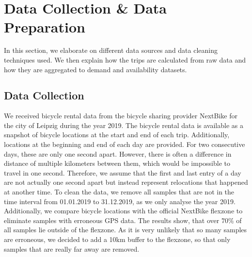 \section{Data Collection \& Data Preparation}
\label{sec:data_collection_and_data_preparation}
In this section, we elaborate on different data sources and data cleaning techniques used. We then explain how the trips are calculated from raw data and how they are aggregated to demand and availability datasets.


\subsection{Data Collection}
We received bicycle rental data from the bicycle sharing provider NextBike for the city of Leipzig during the year 2019.
% 
The bicycle rental data is available as a snapshot of bicycle locations at the start and end of each trip. Additionally, locations at the beginning and end of each day are provided. For two consecutive days, these are only one second apart. However, there is often a difference in distance of multiple kilometers between them, which would be impossible to travel in one second.
Therefore, we assume that the first and last entry of a day are not actually one second apart but instead represent relocations that happened at another time. To clean the data, we remove all samples that are not in the time interval from 01.01.2019 to 31.12.2019, as we only analyse the year 2019. Additionally, we compare bicycle locations with the official NextBike flexzone to eliminate samples with erroneous GPS data. The results show, that over \(70\%\) of all samples lie outside of the flexzone. As it is very unlikely that so many samples are erroneous, we decided to add a 10km buffer to the flexzone, so that only samples that are really far away are removed.

